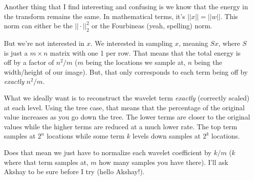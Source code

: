 \documentclass[leqno]{article}
\begin{document}
                Another thing that I find interesting and confusing is we know that the energy in the transform remains the same. In mathematical terms, it's $||x|| = ||w||$. This norm can either be the $||\cdot||_2^2$ or the Fourbineas (yeah, spelling) norm.

                But we're not interested in $x$. We interested in sampling $x$, meaning $Sx$, where $S$ is just a $m \times n$ matrix with one 1 per row. That means that the total energy is off by a factor of $n^2 / m$ ($m$ being the locations we sample at, $n$ being the width/height of our image). But, that only corresponds to each term being off by \textit{exactly} $n^2 / m$.

                What we ideally want is to reconstruct the wavelet term \textit{exactly} (correctly scaled) at each level. Using the tree case, that means that the percentage of the original value increases as you go down the tree. The lower terms are closer to the original values while the higher terms are reduced at a much lower rate. The top term samples at $2^n$ locations while some term $k$ levels down samples at $2^k$ locations.

                Does that mean we just have to normalize each wavelet coefficient by $k / m$ ($k$ where that term samples at, $m$ how many samples you have there). I'll ask Akshay to be sure before I try (hello Akshay!).




            
            
            \printbibliography{}
\end{document}
